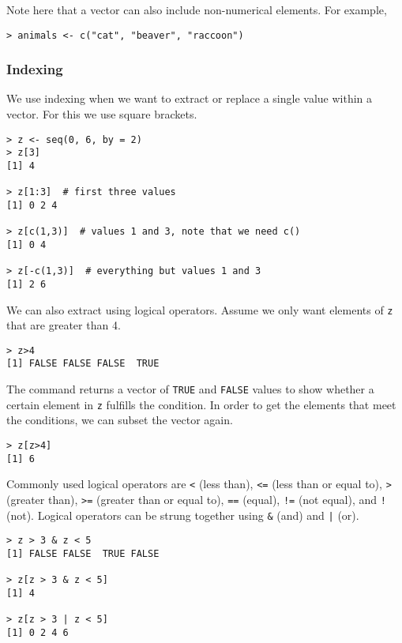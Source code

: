 Note here that a vector can also include non-numerical elements. For example,

\begin{lstlisting}
> animals <- c("cat", "beaver", "raccoon")
\end{lstlisting}

\subsubsection*{Indexing}

We use indexing when we want to extract or replace a single value within a vector. For this we use square brackets.

\begin{lstlisting}
> z <- seq(0, 6, by = 2)
> z[3]
[1] 4

> z[1:3]  # first three values
[1] 0 2 4

> z[c(1,3)]  # values 1 and 3, note that we need c()
[1] 0 4

> z[-c(1,3)]  # everything but values 1 and 3
[1] 2 6
\end{lstlisting}

We can also extract using logical operators. Assume we only want elements of \verb|z| that are greater than 4. 

\begin{lstlisting}
> z>4
[1] FALSE FALSE FALSE  TRUE
\end{lstlisting}

The command returns a vector of \texttt{TRUE} and \texttt{FALSE} values to show whether a certain element in \texttt{z} fulfills the condition. In order to get the elements that meet the conditions, we can subset the vector again.

\begin{lstlisting}
> z[z>4]
[1] 6
\end{lstlisting}

Commonly used logical operators are \verb|<| (less than), \verb|<=| (less than or equal to), \verb|>| (greater than), \verb|>=| (greater than or equal to), \verb|==| (equal), \verb|!=| (not equal), and \verb|!| (not). Logical operators can be strung together using \verb|&| (and) and \texttt{|} (or).

\begin{lstlisting}
> z > 3 & z < 5
[1] FALSE FALSE  TRUE FALSE

> z[z > 3 & z < 5]
[1] 4

> z[z > 3 | z < 5]
[1] 0 2 4 6
\end{lstlisting}

